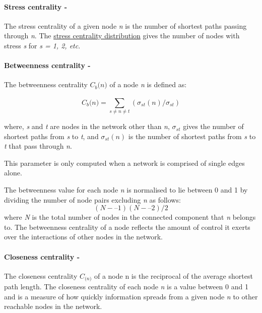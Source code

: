 \paragraph{Stress centrality -}

The stress centrality of a given node \textit{n} is the number of shortest paths passing through \textit{n}. The \underline{stress centrality distribution} gives the number of nodes with stress \textit{s} for \textit{s = 1, 2, etc}. 

\paragraph{Betweenness centrality -}

The betweenness centrality $C_b\textit{(n)}$ of a node \textit{n} is defined as:

\begin{equation}
C_b\textit{(n)} = \textstyle \sum_{s\neq n\neq t}^{}  (\sigma_{st}(n)/\sigma_{st})
\end{equation}

where, \textit{s} and \textit{t} are nodes in the network other than \textit{n}, $\sigma_{st}$ gives the number of shortest paths from \textit{s} to \textit{t}, and $\sigma_{st}(n)$ is the number of shortest paths from \textit{s} to \textit{t} that pass through \textit{n}.

This parameter is only computed when a network is comprised of single edges alone. 

The betweenness value for each node \textit{n} is normalised to lie between 0 and 1 by dividing the number of node pairs excluding \textit{n} as follows:
\begin{equation}
(\textit{N} -– 1)(\textit{N} -– 2) / 2
\end{equation}
 where \textit{N} is the total number of nodes in the connected component that \textit{n} belongs to. The betweenness centrality of a node reflects the amount of control it exerts over the interactions of other nodes in the network.

\paragraph{Closeness centrality -}

The closeness centrality $C_\textit{(n)}$ of a node n is the reciprocal of the average shortest path length. The closeness centrality of each node \textit{n} is a value between 0 and 1 and is a measure of how quickly information spreads from a given node \textit{n} to other reachable nodes in the network.

